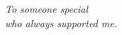 \thispagestyle{empty}


\begin{flushright}
 \foreignlanguage{english}{
  \textit{
   To someone special\\%
   who always supported me.%
  }
 } 
\end{flushright}

\null

\clearpage
